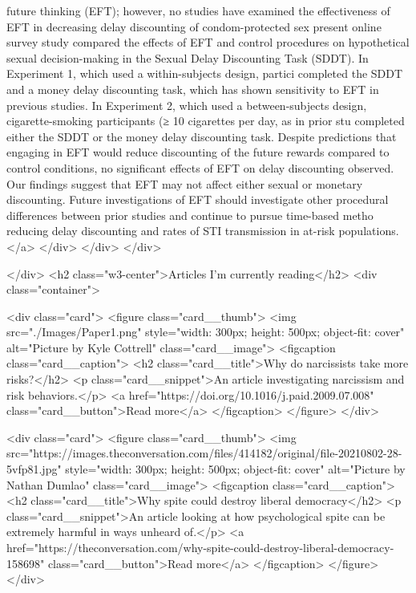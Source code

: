                     future thinking (EFT); however, no studies have examined the effectiveness of EFT in decreasing delay discounting of condom-protected sex present online survey study compared the effects of EFT and control procedures on hypothetical
                    sexual decision-making in the Sexual Delay Discounting Task (SDDT). In Experiment 1, which used a within-subjects design, partici completed the SDDT and a money delay discounting task, which has shown sensitivity to EFT in previous
                    studies. In Experiment 2, which used a between-subjects design, cigarette-smoking participants (≥ 10 cigarettes per day, as in prior stu completed either the SDDT or the money delay discounting task. Despite predictions that engaging
                    in EFT would reduce discounting of the future rewards compared to control conditions, no significant effects of EFT on delay discounting observed. Our findings suggest that EFT may not affect either sexual or monetary discounting.
                    Future investigations of EFT should investigate other procedural differences between prior studies and continue to pursue time-based metho reducing delay discounting and rates of STI transmission in at-risk populations.</a>
            </div>
            </div>
        </div>

    </div>
    <h2 class="w3-center">Articles I'm currently reading</h2>
    <div class="container">

        <div class="card">
            <figure class="card__thumb">
                <img src="./Images/Paper1.png" style="width: 300px; height: 500px; object-fit: cover"
                    alt="Picture by Kyle Cottrell" class="card__image">
                <figcaption class="card__caption">
                    <h2 class="card__title">Why do narcissists take more risks?</h2>
                    <p class="card__snippet">An article investigating narcissism and risk behaviors.</p>
                    <a href="https://doi.org/10.1016/j.paid.2009.07.008" class="card__button">Read more</a>
                </figcaption>
            </figure>
        </div>

        <div class="card">
            <figure class="card__thumb">
                <img src="https://images.theconversation.com/files/414182/original/file-20210802-28-5vfp81.jpg" style="width: 300px; height: 500px; object-fit: cover" alt="Picture by Nathan Dumlao" class="card__image">
                <figcaption class="card__caption">
                    <h2 class="card__title">Why spite could destroy liberal democracy</h2>
                    <p class="card__snippet">An article looking at how psychological spite can be extremely harmful in ways unheard of.</p>
                    <a href="https://theconversation.com/why-spite-could-destroy-liberal-democracy-158698" class="card__button">Read more</a>
                </figcaption>
            </figure>
        </div>

